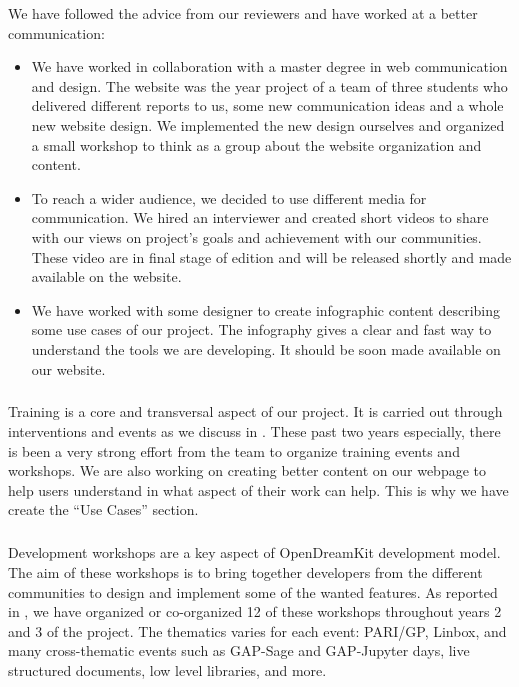 We have followed the advice from our reviewers and have worked at a better communication:
\begin{itemize}
\item We have worked in collaboration with a master degree in web communication and design. The 
\ODK website was the year project of a team of three students who delivered different reports to us, some
new communication ideas and a whole new website design. We implemented the new design ourselves and 
organized a small workshop to think as a group about the website organization and content. 
\item To reach a wider audience, we decided to use different media for communication. We hired an interviewer
and created short videos to share with our views on project's goals and achievement with our communities. These
video are in final stage of edition and will be released shortly and made available on the website.
\item We have worked with some designer to create infographic content describing some use cases
of our project. The infography gives a clear and fast way to understand the tools we are developing. It
should be soon made available on our website.
\end{itemize}

\subparagraph{}

Training is a core and transversal aspect of our project. It is carried out
through interventions and events as we discuss in . These 
past two years especially, there is been a very strong effort from the \ODK team to organize 
training events and workshops. We are also working on creating better content on our webpage
to help users understand in what aspect of their work can \ODK help. This is why we have create the 
``Use Cases'' section.

\subparagraph{}
\label{dissem@devel-workshops}

Development workshops are a key aspect of OpenDreamKit development model. The aim of these workshops is to bring together developers from the different communities to design and implement some
of the wanted features. As reported in , we have organized
or co-organized 12 of these workshops throughout years 2 and 3 of the project. The thematics varies
for each event: PARI/GP, Linbox, and many cross-thematic events such as GAP-Sage and GAP-Jupyter days, 
live structured documents, low level libraries, and more.

